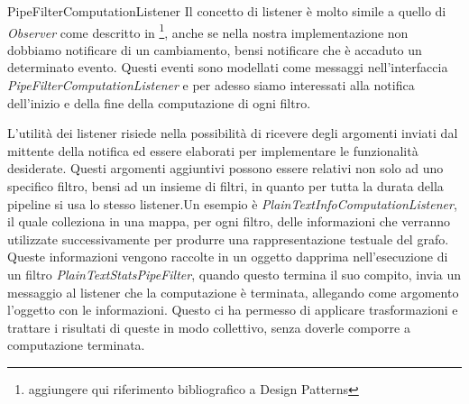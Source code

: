 \begin{paragraph}{PipeFilterComputationListener}
  Il concetto di listener \`e molto simile a quello di \emph{Observer}
  come descritto in \footnote{aggiungere qui riferimento bibliografico
    a Design Patterns}, anche se nella nostra implementazione non
  dobbiamo notificare di un cambiamento, bensi notificare che \`e
  accaduto un determinato evento. Questi eventi sono modellati come
  messaggi nell'interfaccia \emph{PipeFilterComputationListener} e per
  adesso siamo interessati alla notifica dell'inizio e della fine
  della computazione di ogni filtro.

  L'utilit\`a dei listener risiede nella possibilit\`a di ricevere
  degli argomenti inviati dal mittente della notifica ed essere
  elaborati per implementare le funzionalit\`a desiderate. Questi
  argomenti aggiuntivi possono essere relativi non solo ad uno
  specifico filtro, bensi ad un insieme di filtri, in quanto per tutta
  la durata della pipeline si usa lo stesso listener.Un esempio \`e
  \emph{PlainTextInfoComputationListener}, il quale colleziona in una
  mappa, per ogni filtro, delle informazioni che verranno utilizzate
  successivamente per produrre una rappresentazione testuale del
  grafo. Queste informazioni vengono raccolte in un oggetto dapprima
  nell'esecuzione di un filtro \emph{PlainTextStatsPipeFilter}, quando
  questo termina il suo compito, invia un messaggio al listener che la
  computazione \`e terminata, allegando come argomento l'oggetto con
  le informazioni. Questo ci ha permesso di applicare trasformazioni e
  trattare i risultati di queste in modo collettivo, senza doverle
  comporre a computazione terminata.


\end{paragraph}

